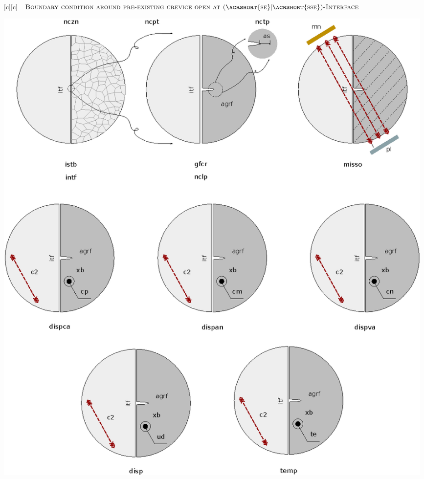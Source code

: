 [c][c]   {\scriptsize
	$\textsc{Boundary condition around pre-existing crevice
			open at (\acrshort{se}$|$\acrshort{sse})-Interface}$}

\includegraphics[width=0.99\textwidth]{structuralfivefields_multi.eps}